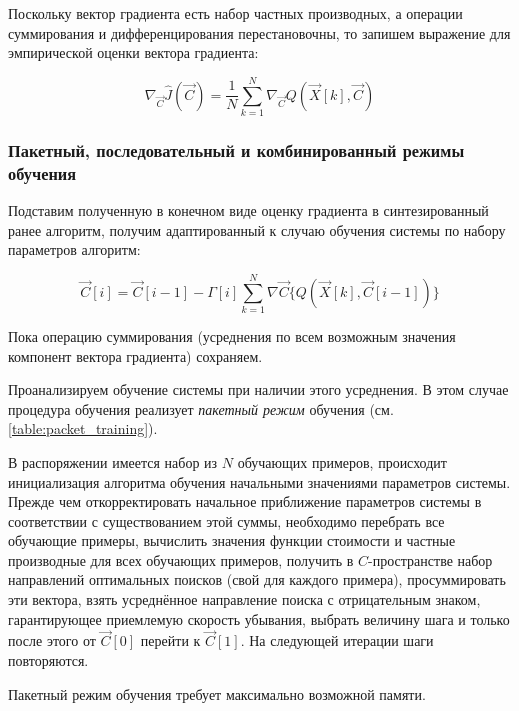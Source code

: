 \documentclass{article}
\numberwithin{equation}{subsection}
\begin{document}
Поскольку вектор градиента есть набор частных производных, а операции суммирования 
и дифференцирования перестановочны, то запишем выражение для эмпирической оценки вектора
градиента:

\begin{equation}
    \nabla_{\vec{C}} {\hat{J}(\vec{C})} = \dfrac{1}{N} \sum_{k=1}^{N} \nabla_{\vec{C}}{Q(\vec{X}[k], \vec{C})}
\end{equation}




\subsubsection{Пакетный, последовательный и комбинированный режимы обучения}

Подставим полученную в конечном виде оценку градиента в синтезированный ранее алгоритм,
получим адаптированный к случаю обучения системы по набору параметров алгоритм:

\begin{equation}
    \vec{C}[i] = \vec{C}[i-1] - \Gamma[i] \sum_{k=1}^{N} \nabla\vec{C} \{ Q(\vec{X}[k], \vec{C}[i-1]) \}
\end{equation}

Пока операцию суммирования (усреднения по всем возможным значения компонент вектора 
градиента) сохраняем.

Проанализируем обучение системы при наличии этого усреднения. В этом случае процедура 
обучения реализует \textit{пакетный режим} обучения (см. \ref{table:packet_training}).

В распоряжении имеется набор из $N$ обучающих примеров, происходит инициализация алгоритма
обучения начальными значениями параметров системы. Прежде чем откорректировать начальное
приближение параметров системы в соответствии с существованием этой суммы, необходимо
перебрать все обучающие примеры, вычислить значения функции стоимости и частные 
производные для всех обучающих примеров, получить в $C$-пространстве набор направлений
оптимальных поисков (свой для каждого примера), просуммировать эти вектора, взять 
усреднённое направление поиска с отрицательным знаком, гарантирующее приемлемую скорость
убывания, выбрать величину шага и только после этого от $\vec{C}[0]$ перейти к $\vec{C}[1]$.
На следующей итерации шаги повторяются.

Пакетный режим обучения требует максимально возможной памяти.
\end{document}
